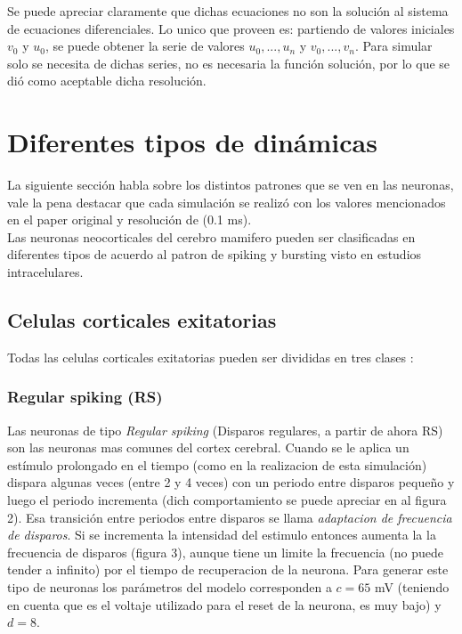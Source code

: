 \documentclass[12pt]{article}
\begin{document}
Se puede apreciar claramente que dichas ecuaciones no son la solución al sistema de ecuaciones diferenciales. Lo unico que proveen es: partiendo de valores iniciales $v_0$ y $u_0$,
se puede obtener la serie de valores $u_0,...,u_n$ y $v_0,...,v_n$. Para simular solo se necesita de dichas series, no es necesaria la función solución, por lo que se dió como aceptable dicha resolución.

\section{Diferentes tipos de dinámicas}

La siguiente sección habla sobre los distintos patrones que se ven en las neuronas, vale la pena destacar que cada simulación se realizó con los valores
mencionados en el paper original y resolución de (0.1 ms). \\

Las neuronas neocorticales del cerebro mamifero pueden ser clasificadas en diferentes tipos de acuerdo al patron de spiking y bursting visto en estudios intracelulares. \\

\subsection{Celulas corticales exitatorias}
Todas las celulas corticales exitatorias pueden ser divididas en tres clases \cite{firingPatters} \cite{chatteringCells}:

\newpage
\subsubsection{Regular spiking (RS)}
Las neuronas de tipo \textit{Regular spiking} (Disparos regulares, a partir de ahora RS) son las neuronas mas comunes del cortex cerebral. Cuando se le aplica un estímulo prolongado en el tiempo (como en la realizacion de esta simulación)
dispara algunas veces (entre 2 y 4 veces) con un periodo entre disparos pequeño y luego el periodo incrementa (dich comportamiento se puede apreciar en al figura 2). Esa transición entre periodos entre disparos se llama \textit{adaptacion de frecuencia de disparos}.
Si se incrementa la intensidad del estimulo entonces aumenta la la frecuencia de disparos (figura 3), aunque tiene un limite la frecuencia (no puede tender a infinito) por el tiempo de recuperacion de la neurona.
Para generar este tipo de neuronas los parámetros del modelo corresponden a $c = 65$ mV (teniendo en cuenta que
es el voltaje utilizado para el reset de la neurona, es muy bajo) y $d=8$.
\end{document}
